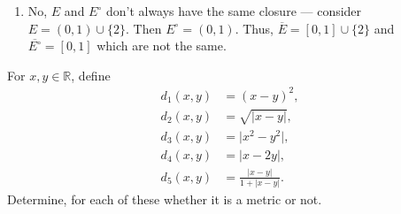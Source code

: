 \documentclass[12 pt, letterpaper]{hmcpset}
\begin{document}
\begin{solution}
\begin{enumerate}
			Since every neighbourhood of $0$ clearly contains distinct points of the annulus, $0$ is a limit point of $E$, and thus, $0 \in \overline{E}$. Since $N_{1}(0) \subseteq \overline{E}$, it is also an interior point of $\overline{E}$. However, since $0$ is not even in $E$, it is not an interior point of $E$. Thus, $\overline{E}^{\circ} \neq E^{\circ}$.
		\item No, $E$ and $E^{\circ}$ don't always have the same closure --- consider $E = (0, 1) \cup \{ 2 \}$. Then $E^{\circ} = (0, 1)$. Thus, $\overline{E} = [0, 1] \cup \{ 2 \}$ and $\overline{E^{\circ}} = [0, 1]$ which are not the same.
	\end{enumerate}
\end{solution}

\pagebreak

\begin{problem}
	For $x, y \in \mathbb{R}$, define
	\[
		\begin{split}
			d_{1}(x, y) & = (x - y)^{2}, \\
			d_{2}(x, y) & = \sqrt{\lvert x - y \rvert}, \\
			d_{3}(x, y) & = \lvert x^{2} - y^{2} \rvert, \\
			d_{4}(x, y) & = \lvert x - 2y \rvert, \\
			d_{5}(x, y) & = \frac{\lvert x - y \rvert}{1 + \lvert x - y \rvert}.
		\end{split}
	\]
	Determine, for each of these whether it is a metric or not.
\end{problem}
\end{document}
